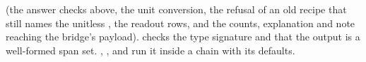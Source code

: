  (the answer checks above, the unit conversion, the refusal of
an old recipe that still names the unitless , the readout rows, and the counts,
explanation and note reaching the bridge's payload). 
checks the type signature and that the output is a well-formed span set. , ,
 and  run
it inside a chain with its defaults.
